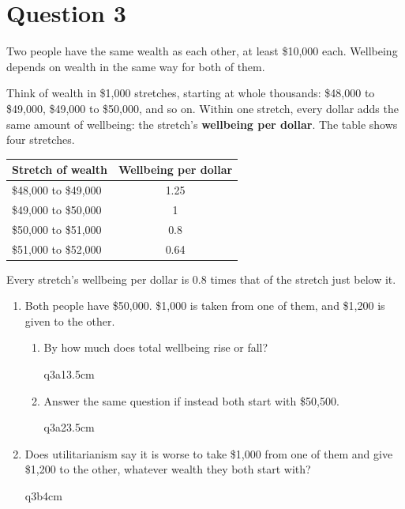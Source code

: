 \begin{Form}
\begin{enumerate}
\end{enumerate}

\section*{Question 3}

Two people have the same wealth as each other, at least \$10,000 each. Wellbeing depends on wealth in the same way for both of them.

Think of wealth in \$1,000 stretches, starting at whole thousands: \$48,000 to \$49,000, \$49,000 to \$50,000, and so on. Within one stretch, every dollar adds the same amount of wellbeing: the stretch's \textbf{wellbeing per dollar}. The table shows four stretches.
\begin{center}
\begin{tabular}{@{}lc@{}}
  \toprule
  Stretch of wealth & Wellbeing per dollar \\ \midrule
  \$48,000 to \$49,000 & 1.25 \\
  \$49,000 to \$50,000 & 1 \\
  \$50,000 to \$51,000 & 0.8 \\
  \$51,000 to \$52,000 & 0.64 \\ \bottomrule
\end{tabular}
\end{center}
Every stretch's wellbeing per dollar is 0.8 times that of the stretch just below it.

\begin{enumerate}
  \item Both people have \$50,000. \$1,000 is taken from one of them, and \$1,200 is given to the other.
  \begin{enumerate}
    \item By how much does total wellbeing rise or fall?
\begin{answer}{q3a1}{3.5cm}
\end{answer}

    \item Answer the same question if instead both start with \$50,500.
\begin{answer}{q3a2}{3.5cm}
\end{answer}

  \end{enumerate}
  \item Does utilitarianism say it is worse to take \$1,000 from one of them and give \$1,200 to the other, whatever wealth they both start with?
\begin{answer}{q3b}{4cm}
\end{answer}


\end{enumerate}
\end{Form}
